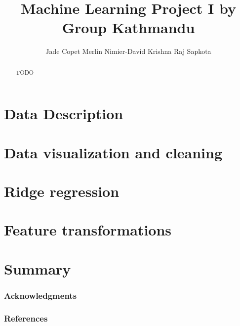 \documentclass{article} %
\title{Machine Learning Project I by Group Kathmandu}
\author{
  Jade Copet \And
  Merlin Nimier-David \And
  Krishna Raj Sapkota
}
\begin{document}
\maketitle

\begin{abstract}
  TODO
\end{abstract}

\section{Data Description}

\section{Data visualization and cleaning}

\section{Ridge regression}

\section{Feature transformations}

\section{Summary}

\subsubsection*{Acknowledgments}

\subsubsection*{References}
\end{document}

